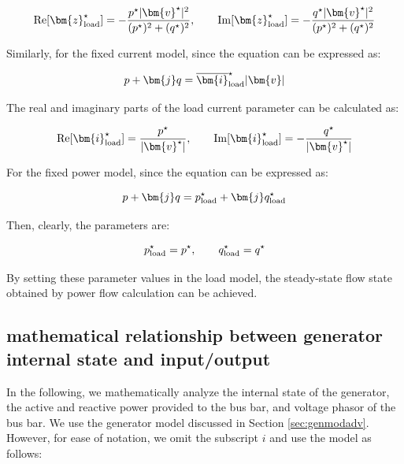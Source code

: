 \documentclass[graybox, envcountchap]{svmult}
\begin{document}
\begin{equation}\label{eq:lmodimppara}
  \operatorname{Re} [\bm{z}_{\rm load}^{\star}] = - \frac{ p^{\star} |\bm{v}^{\star}|^2 }{(p^{\star})^2 + (q^{\star})^2}
  ,\qquad
  \operatorname{Im} [\bm{z}_{\rm load}^{\star}] = - \frac{ q^{\star} |\bm{v}^{\star}|^2 }{(p^{\star})^2 + (q^{\star})^2}
\end{equation}

Similarly, for the fixed current model, since the equation can be expressed as:

\begin{equation}
  p + \bm{j} q = \overline{\bm{i}}_{\rm load}^{\star} |\bm{v}|
\end{equation}

The real and imaginary parts of the load current parameter can be calculated as:

\begin{equation*}
  \operatorname{Re} [\bm{i}_{\rm load}^{\star}] =\frac{p^{\star} }{|\bm{v}^{\star}|},\qquad
  \operatorname{Im} [\bm{i}_{\rm load}^{\star}] = -\frac{ q^{\star} }{|\bm{v}^{\star}|}
\end{equation*}

For the fixed power model, since the equation can be expressed as:

\begin{equation}
  p + \bm{j} q =
  p_{{\rm load}}^{\star} + \bm{j} q_{{\rm load}}^{\star} 
\end{equation}

Then, clearly, the parameters are:

\begin{equation*}
  p_{\rm load}^{\star}=p^{\star}
  ,\qquad
  q_{\rm load}^{\star}=q^{\star}
\end{equation*}

By setting these parameter values in the load model, the steady-state flow state
obtained by power flow calculation can be achieved.

\subsection{mathematical relationship between generator internal state and
input/output}\label{sec:gensspq}

In the following, we mathematically analyze the internal state of the generator,
the active and reactive power provided to the bus bar, and voltage phasor of the
bus bar. We use the generator model discussed in Section \ref{sec:genmodadv}.
However, for ease of notation, we omit the subscript $i$ and use the model as
follows:
\end{document}
